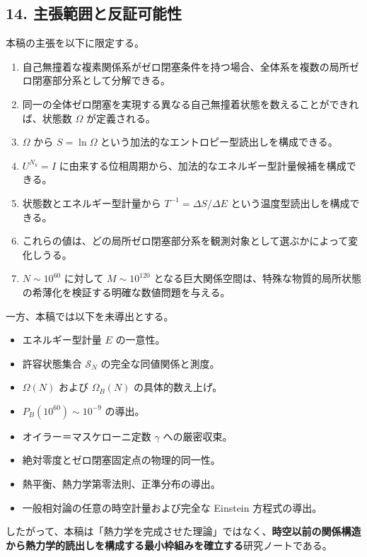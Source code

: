 \documentclass[
  a4paper,
]{ltjsarticle}
\providecommand{\tightlist}{%
  \setlength{\itemsep}{0pt}\setlength{\parskip}{0pt}}
\begin{document}
\subsection{14.
主張範囲と反証可能性}\label{ux4e3bux5f35ux7bc4ux56f2ux3068ux53cdux8a3cux53efux80fdux6027}

本稿の主張を以下に限定する。

\begin{enumerate}
\def\labelenumi{\arabic{enumi}.}
\tightlist
\item
  自己無撞着な複素関係系がゼロ閉塞条件を持つ場合、全体系を複数の局所ゼロ閉塞部分系として分解できる。
\item
  同一の全体ゼロ閉塞を実現する異なる自己無撞着状態を数えることができれば、状態数
  \(\Omega\) が定義される。
\item
  \(\Omega\) から \(S=\ln\Omega\)
  という加法的なエントロピー型読出しを構成できる。
\item
  \(U^{N_k}=I\)
  に由来する位相周期から、加法的なエネルギー型計量候補を構成できる。
\item
  状態数とエネルギー型計量から \(T^{-1}=\Delta S/\Delta E\)
  という温度型読出しを構成できる。
\item
  これらの値は、どの局所ゼロ閉塞部分系を観測対象として選ぶかによって変化しうる。
\item
  \(N\sim10^{60}\) に対して \(M\sim10^{120}\)
  となる巨大関係空間は、特殊な物質的局所状態の希薄化を検証する明確な数値問題を与える。
\end{enumerate}

一方、本稿では以下を未導出とする。

\begin{itemize}
\tightlist
\item
  エネルギー型計量 \(E\) の一意性。
\item
  許容状態集合 \(\mathcal{S}_N\) の完全な同値関係と測度。
\item
  \(\Omega(N)\) および \(\Omega_B(N)\) の具体的数え上げ。
\item
  \(P_B(10^{60})\sim10^{-9}\) の導出。
\item
  オイラー＝マスケローニ定数 \(\gamma\) への厳密収束。
\item
  絶対零度とゼロ閉塞固定点の物理的同一性。
\item
  熱平衡、熱力学第零法則、正準分布の導出。
\item
  一般相対論の任意の時空計量および完全な Einstein 方程式の導出。
\end{itemize}

したがって、本稿は「熱力学を完成させた理論」ではなく、\textbf{時空以前の関係構造から熱力学的読出しを構成する最小枠組みを確立する}研究ノートである。
\end{document}
